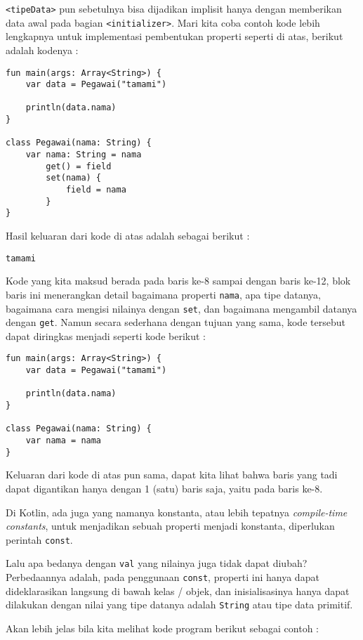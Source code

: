  \texttt{<tipeData>} pun sebetulnya bisa dijadikan implisit hanya dengan memberikan data awal pada bagian \texttt{<initializer>}. Mari kita coba contoh kode lebih lengkapnya untuk implementasi pembentukan properti seperti di atas, berikut adalah kodenya :

\begin{lstlisting}
fun main(args: Array<String>) {
	var data = Pegawai("tamami")
	
	println(data.nama)
}

class Pegawai(nama: String) {
	var nama: String = nama	
		get() = field
		set(nama) {
			field = nama
		}
}
\end{lstlisting}

Hasil keluaran dari kode di atas adalah sebagai berikut :

\begin{lstlisting}
tamami
\end{lstlisting}

Kode yang kita maksud berada pada baris ke-8 sampai dengan baris ke-12, blok baris ini menerangkan detail bagaimana properti \texttt{nama}, apa tipe datanya, bagaimana cara mengisi nilainya dengan \texttt{set}, dan bagaimana mengambil datanya dengan \texttt{get}. Namun secara sederhana dengan tujuan yang sama, kode tersebut dapat diringkas menjadi seperti kode berikut :

\begin{lstlisting}
fun main(args: Array<String>) {
	var data = Pegawai("tamami")
	
	println(data.nama)
}

class Pegawai(nama: String) {
	var nama = nama
}
\end{lstlisting}

Keluaran dari kode di atas pun sama, dapat kita lihat bahwa baris yang tadi dapat digantikan hanya dengan 1 (satu) baris saja, yaitu pada baris ke-8.

Di Kotlin, ada juga yang namanya konstanta, atau lebih tepatnya \textit{compile-time constants}, untuk menjadikan sebuah properti menjadi konstanta, diperlukan perintah \texttt{const}. 

Lalu apa bedanya dengan \texttt{val} yang nilainya juga tidak dapat diubah? Perbedaannya adalah, pada penggunaan \texttt{const}, properti ini hanya dapat dideklarasikan langsung di bawah kelas / objek, dan inisialisasinya hanya dapat dilakukan dengan nilai yang tipe datanya adalah \texttt{String} atau tipe data primitif.

Akan lebih jelas bila kita melihat kode program berikut sebagai contoh :

